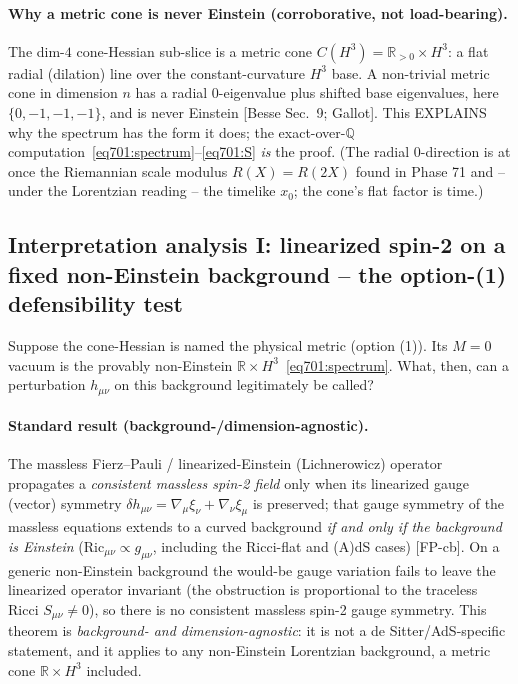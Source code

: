 \paragraph{Why a metric cone is never Einstein (corroborative, not load-bearing).} The
dim-$4$ cone-Hessian sub-slice is a metric cone $C(H^3)=\mathbb{R}_{>0}\times H^3$: a
flat radial (dilation) line over the constant-curvature $H^3$ base. A non-trivial metric
cone in dimension $n$ has a radial $0$-eigenvalue plus shifted base eigenvalues, here
$\{0,-1,-1,-1\}$, and is never Einstein [Besse Sec.~9; Gallot]. This EXPLAINS why the
spectrum has the form it does; the exact-over-$\mathbb{Q}$
computation~\eqref{eq701:spectrum}--\eqref{eq701:S} \emph{is} the proof. (The radial
$0$-direction is at once the Riemannian scale modulus $R(X)=R(2X)$ found in Phase 71 and
-- under the Lorentzian reading -- the timelike $x_0$; the cone's flat factor is time.)

\subsection{Interpretation analysis I: linearized spin-2 on a fixed non-Einstein
            background -- the option-(1) defensibility test}
\label{sec701:spin2}

Suppose the cone-Hessian is named the physical metric (option (1)). Its $M=0$ vacuum is
the provably non-Einstein $\mathbb{R}\times H^3$~\eqref{eq701:spectrum}. What, then, can
a perturbation $h_{\mu\nu}$ on this background legitimately be called?

\paragraph{Standard result (background-/dimension-agnostic).} The massless Fierz--Pauli
/ linearized-Einstein (Lichnerowicz) operator propagates a \emph{consistent massless
spin-2 field} only when its linearized gauge (vector) symmetry
$\delta h_{\mu\nu}=\nabla_\mu\xi_\nu+\nabla_\nu\xi_\mu$ is preserved; that gauge symmetry
of the massless equations extends to a curved background \emph{if and only if the
background is Einstein} ($\mathrm{Ric}_{\mu\nu}\propto g_{\mu\nu}$, including the
Ricci-flat and (A)dS cases) [FP-cb]. On a generic non-Einstein background the would-be
gauge variation fails to leave the linearized operator invariant (the obstruction is
proportional to the traceless Ricci $S_{\mu\nu}\neq0$), so there is no consistent
massless spin-2 gauge symmetry. This theorem is \emph{background- and
dimension-agnostic}: it is not a de Sitter/AdS-specific statement, and it applies to any
non-Einstein Lorentzian background, a metric cone $\mathbb{R}\times H^3$ included.

